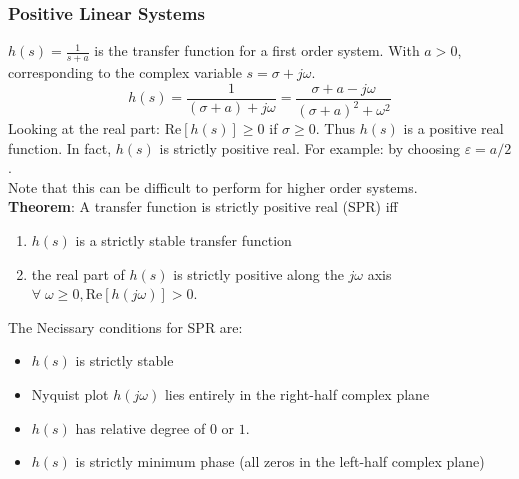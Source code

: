 \documentclass[11pt,handout]{beamer}   %
\begin{document}
\begin{frame}
\frametitle{Positive Linear Systems}
\footnotesize
$h(s) = \frac{1}{s+a}$ is the transfer function for a first order system. With $a>0$, corresponding to the complex variable $s = \sigma + j \omega$.
\begin{equation*}
h(s) = \frac{1}{(\sigma + a) + j\omega} = \frac{\sigma + a - j\omega}{(\sigma + a)^2 + \omega^2}
\end{equation*}
Looking at the real part: $\text{Re}[h(s)] \geq 0$ if $\sigma \geq 0$. Thus $h(s)$ is a positive real function. In fact, $h(s)$ is strictly positive real. For example: by choosing $\varepsilon = a/2$.\\
\vspace{6pt}
Note that this can be difficult to perform for higher order systems.\\
\vspace{6pt}
\textbf{Theorem}: A transfer function is strictly positive real (SPR) iff
\begin{enumerate}
\item $h(s)$ is a strictly stable transfer function
\item the real part of $h(s)$ is strictly positive along the $j\omega$ axis $\forall \; \omega \geq 0, \text{Re}[h(j\omega)] >0$.
\end{enumerate}
The Necissary conditions for SPR are:
\begin{itemize}
\item $h(s)$ is strictly stable
\item Nyquist plot $h(j\omega)$ lies entirely in the right-half complex plane
\item $h(s)$ has relative degree of $0$ or $1$.
\item $h(s)$ is strictly minimum phase (all zeros in the left-half complex plane)
\end{itemize}
\end{frame}
\end{document}
